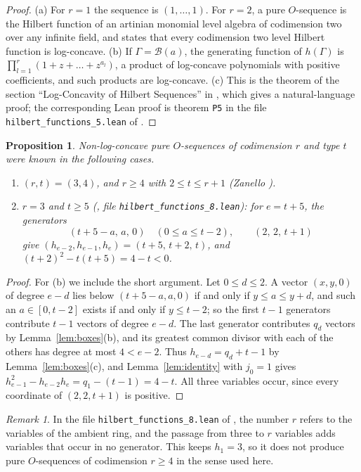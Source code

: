 \documentclass{amsart}
\newtheorem{proposition}[theorem]{Proposition}
\theoremstyle{definition}
\theoremstyle{remark}
\newtheorem{remark}[theorem]{Remark}
\newcommand{\B}{\mathcal{B}}
\begin{document}
\begin{proof}
(a) For $r=1$ the sequence is $(1,\dots,1)$. For $r=2$, a pure $O$-sequence is the Hilbert function of an artinian monomial level algebra of codimension two over any infinite field, and \cite[Proposition~4.3(i)]{Ia} states that every codimension two level Hilbert function is log-concave. (b) If $\Gamma=\B(a)$, the generating function of $h(\Gamma)$ is $\prod_{l=1}^r(1+z+\dots+z^{a_l})$, a product of log-concave polynomials with positive coefficients, and such products are log-concave. (c) This is the theorem of the section ``Log-Concavity of Hilbert Sequences'' in \cite[Appendix~B.4]{TKS}, which gives a natural-language proof; the corresponding Lean proof is theorem \texttt{P5} in the file \texttt{hilbert\_functions\_5.lean} of \cite{AP}.
\end{proof}

\begin{proposition}\label{prop:known-negative}
Non-log-concave pure $O$-sequences of codimension $r$ and type $t$ were known in the following cases.
\begin{enumerate}
\item[(a)] $(r,t)=(3,4)$, and $r\ge 4$ with $2\le t\le r+1$ \textup{(Zanello \cite[Theorem~8]{Za})}.
\item[(b)] $r=3$ and $t\ge 5$ \textup{(\cite{AP}, file \texttt{hilbert\_functions\_8.lean})}: for $e=t+5$, the generators
\[
(t+5-a,\,a,\,0)\quad(0\le a\le t-2),\qquad (2,\,2,\,t+1)
\]
give $(h_{e-2},h_{e-1},h_e)=(t+5,\,t+2,\,t)$, and $(t+2)^2-t(t+5)=4-t<0$.
\end{enumerate}
\end{proposition}

\begin{proof}
For (b) we include the short argument. Let $0\le d\le 2$. A vector $(x,y,0)$ of degree $e-d$ lies below $(t+5-a,a,0)$ if and only if $y\le a\le y+d$, and such an $a\in[0,t-2]$ exists if and only if $y\le t-2$; so the first $t-1$ generators contribute $t-1$ vectors of degree $e-d$. The last generator contributes $q_d$ vectors by Lemma~\ref{lem:boxes}(b), and its greatest common divisor with each of the others has degree at most $4<e-2$. Thus $h_{e-d}=q_d+t-1$ by Lemma~\ref{lem:boxes}(c), and Lemma~\ref{lem:identity} with $j_0=1$ gives $h_{e-1}^2-h_{e-2}h_e=q_1-(t-1)=4-t$. All three variables occur, since every coordinate of $(2,2,t+1)$ is positive.
\end{proof}

\begin{remark}\label{rem:embedding}
In the file \texttt{hilbert\_functions\_8.lean} of \cite{AP}, the number $r$ refers to the variables of the ambient ring, and the passage from three to $r$ variables adds variables that occur in no generator. This keeps $h_1=3$, so it does not produce pure $O$-sequences of codimension $r\ge 4$ in the sense used here.
\end{remark}
\end{document}
